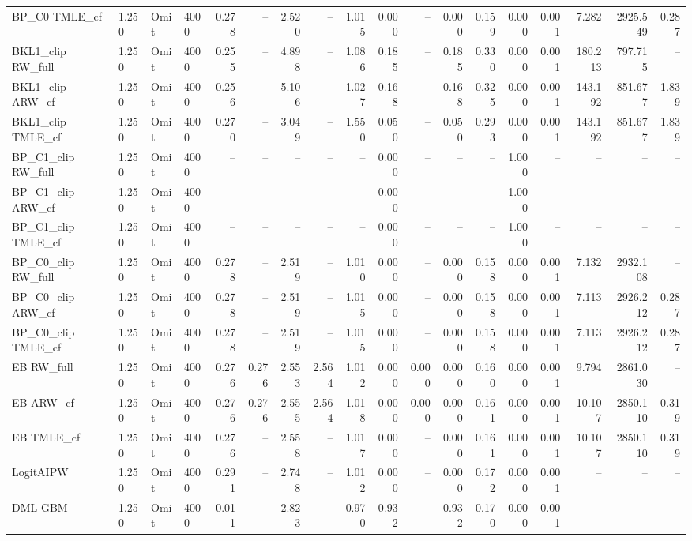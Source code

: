 \begin{tabular}{llllrrrrrrrrrrrrrr}
BP\_C0 TMLE\_cf & 1.250 & Omit & 4000 & 0.278 & -- & 2.520 & -- & 1.015 & 0.000 & -- & 0.000 & 0.159 & 0.000 & 0.001 & 7.282 & 2925.549 & 0.287 \\
BKL1\_clip RW\_full & 1.250 & Omit & 4000 & 0.255 & -- & 4.898 & -- & 1.086 & 0.185 & -- & 0.185 & 0.330 & 0.000 & 0.001 & 180.213 & 797.715 & -- \\
BKL1\_clip ARW\_cf & 1.250 & Omit & 4000 & 0.256 & -- & 5.106 & -- & 1.027 & 0.168 & -- & 0.168 & 0.325 & 0.000 & 0.001 & 143.192 & 851.677 & 1.839 \\
BKL1\_clip TMLE\_cf & 1.250 & Omit & 4000 & 0.270 & -- & 3.049 & -- & 1.550 & 0.050 & -- & 0.050 & 0.293 & 0.000 & 0.001 & 143.192 & 851.677 & 1.839 \\
BP\_C1\_clip RW\_full & 1.250 & Omit & 4000 & -- & -- & -- & -- & -- & 0.000 & -- & -- & -- & 1.000 & -- & -- & -- & -- \\
BP\_C1\_clip ARW\_cf & 1.250 & Omit & 4000 & -- & -- & -- & -- & -- & 0.000 & -- & -- & -- & 1.000 & -- & -- & -- & -- \\
BP\_C1\_clip TMLE\_cf & 1.250 & Omit & 4000 & -- & -- & -- & -- & -- & 0.000 & -- & -- & -- & 1.000 & -- & -- & -- & -- \\
BP\_C0\_clip RW\_full & 1.250 & Omit & 4000 & 0.278 & -- & 2.519 & -- & 1.010 & 0.000 & -- & 0.000 & 0.158 & 0.000 & 0.001 & 7.132 & 2932.108 & -- \\
BP\_C0\_clip ARW\_cf & 1.250 & Omit & 4000 & 0.278 & -- & 2.519 & -- & 1.015 & 0.000 & -- & 0.000 & 0.158 & 0.000 & 0.001 & 7.113 & 2926.212 & 0.287 \\
BP\_C0\_clip TMLE\_cf & 1.250 & Omit & 4000 & 0.278 & -- & 2.519 & -- & 1.015 & 0.000 & -- & 0.000 & 0.158 & 0.000 & 0.001 & 7.113 & 2926.212 & 0.287 \\
EB RW\_full & 1.250 & Omit & 4000 & 0.276 & 0.276 & 2.553 & 2.564 & 1.012 & 0.000 & 0.000 & 0.000 & 0.160 & 0.000 & 0.001 & 9.794 & 2861.030 & -- \\
EB ARW\_cf & 1.250 & Omit & 4000 & 0.276 & 0.276 & 2.555 & 2.564 & 1.018 & 0.000 & 0.000 & 0.000 & 0.161 & 0.000 & 0.001 & 10.107 & 2850.110 & 0.319 \\
EB TMLE\_cf & 1.250 & Omit & 4000 & 0.276 & -- & 2.558 & -- & 1.017 & 0.000 & -- & 0.000 & 0.161 & 0.000 & 0.001 & 10.107 & 2850.110 & 0.319 \\
LogitAIPW & 1.250 & Omit & 4000 & 0.291 & -- & 2.748 & -- & 1.012 & 0.000 & -- & 0.000 & 0.172 & 0.000 & 0.001 & -- & -- & -- \\
DML-GBM & 1.250 & Omit & 4000 & 0.011 & -- & 2.823 & -- & 0.970 & 0.932 & -- & 0.932 & 0.170 & 0.000 & 0.001 & -- & -- & -- \\
\hline
\end{tabular}
